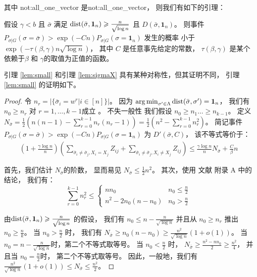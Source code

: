 其中 \gls{not:all_one_vector}
是\glsdesc{not:all_one_vector}，
则我们有如下的引理：
 \begin{lemma}\label{lem:small}
	假设 $\gamma < b $ 且 $\bar{\sigma}$
  满足 
  $\operatorname{dist}(\bar{\sigma}, \mathbf{1}_n) \geqslant \frac{n}{\sqrt{\log  n}}$
	且 $D(\bar{\sigma}, \mathbf{1}_n)$。
	则事件
	$P_{\sigma | G}(\sigma = \bar{\sigma} ) > \exp(-Cn) P_{\sigma | G}(\sigma = \mathbf{1}_n)$
	发生的概率 小于 $\exp(-\tau(\beta, \gamma) n \sqrt{\log  n} )$，
  其中 $C$ 是任意事先给定的常数，
  $\tau(\beta, \gamma)$ 是某个依赖于$\beta$ 和 $\gamma$的取值为正值的函数。
\end{lemma}
引理 \ref{lem:small} 和引理 \ref{lem:sigmaX}  具有某种对称性，但其证明不同，
引理 \ref{lem:small} 的证明如下。
\begin{proof}
	令 $n_r = |\{\bar{\sigma}_i = w^r | i\in [n] \}|$。
  因为 $\operatorname*{arg\,min}_{\sigma'\in \Lambda} \operatorname{dist}(\bar{\sigma}, \sigma') = \mathbf{1}_n$，
  我们有 $n_0 \geq n_r$ 对 $r=1, \dots, k-1$成立 
  。
	不失一般性 我们假设 \mbox{$n_0 \geq n_1 \dots \geq n_{k-1}$}。
	定义
  $N_{\bar{\sigma}} = \frac{1}{2}(n(n-1) - \sum_{r=0}^{k-1} n_r(n_r-1))
	=\frac{1}{2}(n^2 - \sum_{r=0}^{k-1} n_r^2)$。
	简记事件
  $P_{\sigma | G}(\sigma = \bar{\sigma} ) > \exp(-Cn) P_{\sigma | G}(\sigma = \mathbf{1}_n)$ 为
  $D'(\bar{\sigma}, C)$，
	该不等式等价于：
\begin{align}
	(1 + \frac{\gamma \log n}{n})
	\left( \sum_{\bar{\sigma}_i  \neq \bar{\sigma}_j, X_i = X_j} Z_{ij} +
	\sum_{\bar{\sigma}_i  \neq \bar{\sigma}_j, X_i \neq X_j} Z_{ij} \right)
	\leq \frac{\gamma \log n}{n} N_{\bar{\sigma}} + \frac{C}{\beta} n\label{eq:small}
\end{align}
		
	首先，我们估计 $N_{\bar{\sigma}}$的阶数，
  显而易见 $N_{\bar{\sigma}} \leq \frac{1}{2} n^2$。
	其次，使用 文献 附录 A 中的结论，
  我们有：
\begin{equation}
	\sum_{r=0}^{k-1} n_r^2 \leq
	\begin{cases}
	n n_0 & n_0 \leq \frac{n}{2} \\
	n^2 - 2n_0(n-n_0) & n_0 > \frac{n}{2}
	\end{cases}
	\end{equation}
	
	由$\operatorname{dist}(\bar{\sigma}, \mathbf{1}_n) \geqslant \frac{n}{\sqrt{\log n}}$
  的假设，
  我们有 $n_0 \leq n - \frac{n}{\sqrt{\log n}}$
	并且从 $n_0 \geq n_r$ 推出 $n_0 \geq \frac{n}{k}$。
	当 $n_0 > \frac{n}{2}$ 时，
	我们有
  $N_{\bar{\sigma}} \geq n_0 (n - n_0) \geq \frac{n^2}{\sqrt{\log n}}(1+o(1))$。
	当 $n_0 = n - \frac{n}{\sqrt{\log n}}$时，第二个不等式取等号。
  当 $n_0 < \frac{n}{2}$ 时，
	$N_{\bar{\sigma}} \geq \frac{n^2 - nn_0}{2} \geq \frac{n^2}{4}$，
  并且当 $n_0 = \frac{n}{2}$时，
  第二个不等式取等号。
	因此，一般地，我们有 $\frac{n^2}{\sqrt{\log n}}(1+o(1)) \leq N_{\bar{\sigma}} \leq \frac{n^2}{2}$。
	

\end{proof}
